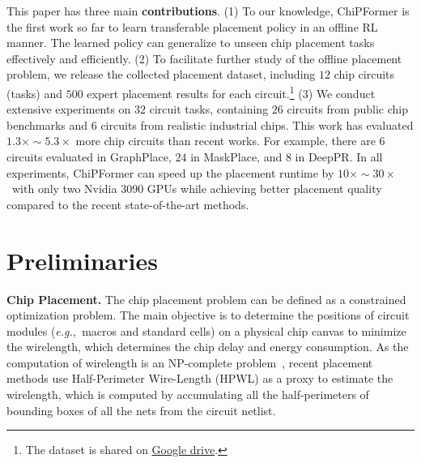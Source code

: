\documentclass{article}
\newcommand{\eg}{\textit{e.g.,}~}
\theoremstyle{plain}
\theoremstyle{definition}
\theoremstyle{remark}
\begin{document}
This paper has {three} main \textbf{contributions}.
(1) To our knowledge, ChiPFormer is the first work so far to learn transferable placement policy in an offline RL manner. The learned policy can generalize to unseen chip placement tasks effectively and efficiently. 
(2) To facilitate further study of the offline placement problem, we  release the {collected} placement dataset, including $12$ chip circuits (tasks) and $500$ {expert} placement results for each circuit.\footnote{The dataset is  shared on \href{https://drive.google.com/drive/folders/1F7075SvjccYk97i2UWhahN_9krBvDCmr?usp=sharing}{Google drive}.}
(3) We conduct extensive experiments on $32$ circuit tasks, containing $26$ circuits from public chip benchmarks and $6$ circuits from {realistic} industrial chips. This work has evaluated $1.3\times \sim 5.3\times$ more chip circuits than recent works.
For example, there are $6$ circuits evaluated in GraphPlace, $24$ in MaskPlace, and $8$ in DeepPR.
In all experiments, ChiPFormer can speed up the placement runtime by $10\times\sim30\times$~with only two Nvidia 3090 GPUs while achieving better placement quality compared to the recent state-of-the-art methods. 

\section{Preliminaries}

\textbf{Chip Placement.} 
The chip placement problem can be defined as a constrained optimization problem. The main objective is to determine the positions of circuit modules (\eg macros and standard cells) on a physical chip canvas
to minimize the wirelength, which determines the chip delay and energy consumption. 
As the computation of wirelength is an NP-complete problem~\citep{garey1977rectilinear}, recent placement methods use Half-Perimeter Wire-Length (HPWL) as a proxy to estimate the wirelength, which is computed by accumulating all the half-perimeters of bounding boxes of all the nets from the circuit netlist. 
\end{document}
